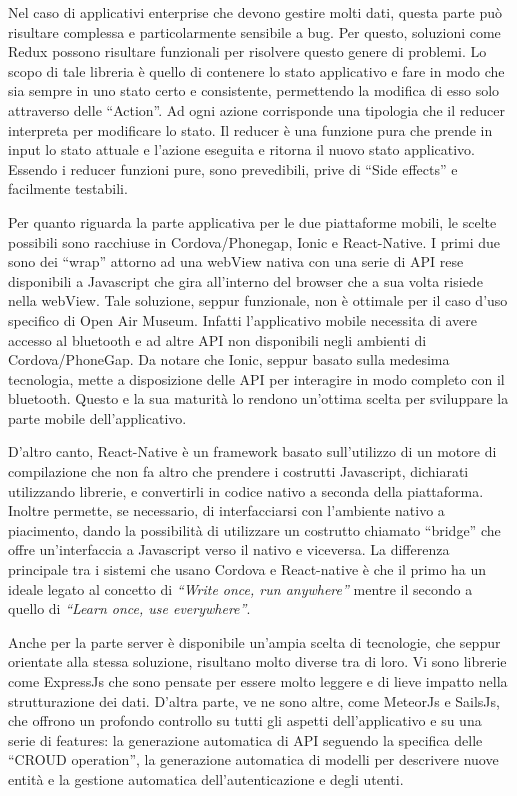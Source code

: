 Nel caso di applicativi enterprise che devono gestire molti dati, questa parte può risultare complessa e particolarmente sensibile a bug. Per questo, soluzioni come Redux possono risultare funzionali per risolvere questo genere di problemi. Lo scopo di tale libreria è quello di contenere lo stato applicativo e fare in modo che sia sempre in uno stato certo e consistente, permettendo la modifica di esso solo attraverso delle “Action”. Ad ogni azione corrisponde una tipologia che il reducer interpreta per modificare lo stato. Il reducer è una funzione pura che prende in input lo stato attuale e l’azione eseguita e ritorna il nuovo stato applicativo. Essendo i reducer funzioni pure, sono prevedibili, prive di “Side effects” e facilmente testabili.\vspace{5mm} 

Per quanto riguarda la parte applicativa per le due piattaforme mobili, le scelte possibili sono racchiuse in Cordova/Phonegap, Ionic e React-Native. I primi due sono dei “wrap” attorno ad una webView nativa con una serie di API rese disponibili a Javascript che gira all’interno del browser che a sua volta risiede nella webView. Tale soluzione, seppur funzionale, non è ottimale per il caso d’uso specifico di Open Air Museum. Infatti l’applicativo mobile necessita di avere accesso al bluetooth e ad altre API non disponibili negli ambienti di Cordova/PhoneGap. Da notare che Ionic, seppur basato sulla medesima tecnologia, mette a disposizione delle API per interagire in modo completo con il bluetooth. Questo e la sua maturità lo rendono un'ottima scelta per sviluppare la parte mobile dell’applicativo.\vspace{5mm} 

D’altro canto, React-Native è un framework basato sull’utilizzo di un motore di compilazione che non fa altro che prendere i costrutti Javascript, dichiarati utilizzando librerie, e convertirli in codice nativo a seconda della piattaforma. Inoltre permette, se necessario, di interfacciarsi con l’ambiente nativo a piacimento, dando la possibilità di utilizzare un costrutto chiamato “bridge” che offre un’interfaccia a Javascript verso il nativo e viceversa. La differenza principale tra i sistemi che usano Cordova e React-native è che il primo ha un ideale legato al concetto di \emph{“Write once, run anywhere”} mentre il secondo a quello di \emph{“Learn once, use everywhere”}.\vspace{5mm}

Anche per la parte server è disponibile un'ampia scelta di tecnologie, che seppur orientate alla stessa soluzione, risultano molto diverse tra di loro. Vi sono librerie come ExpressJs che sono pensate per essere molto leggere e di lieve impatto nella strutturazione dei dati. D'altra parte, ve ne sono altre, come MeteorJs e SailsJs, che offrono un profondo controllo su tutti gli aspetti dell’applicativo e su una serie di features: la generazione automatica di API seguendo la specifica delle “CROUD operation”, la generazione automatica di modelli per descrivere nuove entità e la gestione automatica dell’autenticazione e degli utenti.


